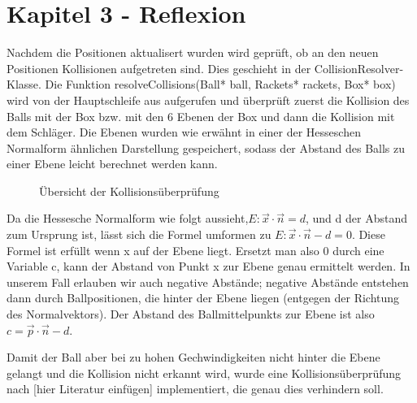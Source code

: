 \section{Kapitel 3 - Reflexion}
\label{Kapitel_4_-_Unterkapitel_2}

Nachdem die Positionen aktualisert wurden wird geprüft, ob an den neuen Positionen Kollisionen aufgetreten sind. Dies geschieht in der CollisionResolver-Klasse. Die Funktion resolveCollisions(Ball* ball, Rackets* rackets, Box* box) wird von der Hauptschleife aus aufgerufen und überprüft zuerst die Kollision des Balls mit der Box bzw. mit den 6 Ebenen der Box und dann die Kollision mit dem Schläger.
Die Ebenen wurden wie erwähnt in einer der Hesseschen Normalform ähnlichen Darstellung gespeichert, sodass der Abstand des Balls zu einer Ebene leicht berechnet werden kann.

\begin{figure}[h]
    \caption[Testbilder]{Übersicht der Kollisionsüberprüfung}
        \label{fig_testbild}
\end{figure} 

Da die Hessesche Normalform wie folgt aussieht,$ E: \vec x \cdot \vec n  = d $, und d der Abstand zum Ursprung ist, lässt sich die Formel umformen zu $ E: \vec x \cdot \vec n  - d = 0$. Diese Formel ist erfüllt wenn x auf der Ebene liegt. Ersetzt man also 0 durch eine Variable c, kann der Abstand von Punkt x zur Ebene genau ermittelt werden. In unserem Fall erlauben wir auch negative Abstände; negative Abstände entstehen dann durch Ballpositionen, die hinter der Ebene liegen (entgegen der Richtung des Normalvektors).
Der Abstand des Ballmittelpunkts zur Ebene ist also $c = \vec p\cdot \vec n - d $.

Damit der Ball aber bei zu hohen Gechwindigkeiten nicht hinter die Ebene gelangt und die Kollision nicht erkannt wird, wurde eine Kollisionsüberprüfung nach [hier Literatur einfügen] implementiert, die genau dies verhindern soll.